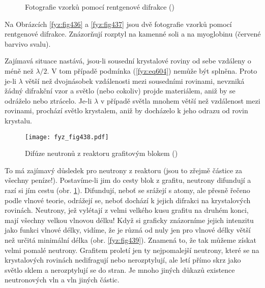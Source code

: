     \begin{figure}[ht!]
      \centering  
      \caption{Fotografie vzorků pomocí rentgenové difrakce (\cite[s.~515]{Feynman01})}
    \end{figure}

    Na Obrázcích \ref{fyz:fig436} a \ref{fyz:fig437} jsou dvě fotografie vzorků pomocí rentgenové
    difrakce. Znázorňují rozptyl na kamenné soli a na myoglobinu (červené barvivo svalu).  
    
    Zajímavá situace nastává, jsou-li sousední krystalové roviny od sebe vzdáleny o méně než
    \(λ/2\). V tom případě podmínka (\ref{fyz:eq604}) nemůže být splněna. Proto je-li \(\lambda\)
    větší než dvojnásobek vzdálenosti mezi sousedními rovinami, nevzniká žádný difrakční vzor a
    světlo (nebo cokoliv) projde materiálem, aniž by se odráželo nebo ztrácelo. Je-li \(\lambda\) v
    případě světla mnohem větší než vzdálenost mezi rovinami, prochází světlo krystalem, aniž by
    docházelo k jeho odrazu od rovin krystalu.  
    
    \begin{figure}[ht!] %
      \centering
      \texttt{[image: fyz\_fig438.pdf]}
      \caption{Difúze neutronů z reaktoru grafitovým blokem (\cite[s.~515]{Feynman01})}
      \label{fyz:fig438}
    \end{figure}

    To má zajímavý důsledek pro neutrony z reaktoru (jsou to zřejmě částice za všechny peníze!).
    Postavíme-li jim do cesty blok z grafitu, neutrony difundují a razí si jím cestu (obr.
    \ref{fyz:fig438}). Difundují, neboť se srážejí s atomy, ale přesně řečeno podle vlnové teorie,
    odrážejí se, neboť dochází k jejich difrakci na krystalových rovinách. Neutrony, jež vylétají z
    velmi velkého kusu grafitu na druhém konci, mají všechny velkou vlnovou délku! Když si graficky
    znázorníme jejich intenzitu jako funkci vlnové délky, vidíme, že je různá od nuly jen pro vlnové
    délky větší než určitá minimální délka (obr. \ref{fyz:fig439}). Znamená to, že tak můžeme získat
    velmi pomalé neutrony. Grafitem proletí jen ty nejpomalejší neutrony, které se na krystalových
    rovinách nedifragují nebo nerozptylují, ale letí přímo skrz jako světlo sklem a nerozptylují se
    do stran. Je mnoho jiných důkazů existence neutronových vln a vln jiných částic.

